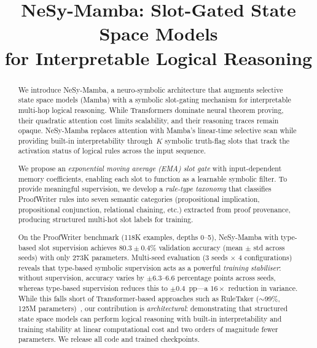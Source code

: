 \documentclass[conference]{IEEEtran}
\DeclareRobustCommand{\model}{NeSy-Mamba}
\begin{document}
\title{NeSy-Mamba: Slot-Gated State Space Models\\for Interpretable Logical Reasoning}

\author{
}

\maketitle

\begin{abstract}
We introduce \model{}, a neuro-symbolic architecture that augments
selective state space models (Mamba) with a symbolic slot-gating
mechanism for interpretable multi-hop logical reasoning. While
Transformers dominate neural theorem proving, their quadratic
attention cost limits scalability, and their reasoning traces
remain opaque.  \model{} replaces attention with Mamba's
linear-time selective scan while providing built-in
interpretability through~$K$ symbolic truth-flag slots that track
the activation status of logical rules across the input sequence.

We propose an \emph{exponential moving average (EMA) slot gate}
with input-dependent memory coefficients, enabling each slot
to function as a learnable symbolic filter.  To provide
meaningful supervision, we develop a \emph{rule-type taxonomy}
that classifies ProofWriter rules into seven semantic categories
(propositional implication, propositional conjunction, relational
chaining, etc.) extracted from proof provenance, producing
structured multi-hot slot labels for training.

On the ProofWriter benchmark (118K examples, depths 0--5),
\model{} with type-based slot supervision achieves
$80.3 \pm 0.4\%$ validation accuracy (mean $\pm$ std across
seeds) with only 273K parameters.  Multi-seed evaluation
(3 seeds $\times$ 4 configurations) reveals that type-based
symbolic supervision acts as a powerful \emph{training
stabiliser}: without supervision, accuracy varies by
$\pm 6.3$--$6.6$ percentage points across seeds, whereas
type-based supervision reduces this to $\pm 0.4$~pp---a
$16\times$ reduction in variance.  While this falls short of
Transformer-based approaches such as RuleTaker ($\sim$99\%,
125M parameters)~\cite{clark2020ruletaker}, our contribution
is \emph{architectural}: demonstrating that structured state
space models can perform logical reasoning with built-in
interpretability and training stability at linear
computational cost and two orders of magnitude fewer
parameters.
We release all code and trained checkpoints.
\end{abstract}
\end{document}
